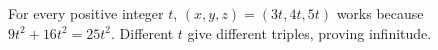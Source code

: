 For every positive integer $ t $, $(x,y,z)=(3t,4t,5t)$ works because $ 9t^2+16t^2=25t^2 $. Different $ t $ give different triples, proving infinitude.
